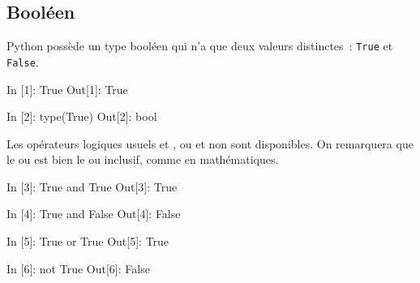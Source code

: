 \documentclass{magnolia}
\begin{document}









\subsection{Booléen}

Python possède un type booléen qui n'a que deux valeurs distinctes~:
\verb_True_ et \verb_False_. 

\begin{pythoncode}
In [1]: True
Out[1]: True

In [2]: type(True)
Out[2]: bool
\end{pythoncode}

\noindent
Les opérateurs logiques usuels \og et \fg, \og ou \fg et \og non \fg sont disponibles. On
remarquera que le \og ou \fg est bien le ou inclusif, comme en mathématiques.

\begin{pythoncode}
In [3]: True and True
Out[3]: True

In [4]: True and False
Out[4]: False

In [5]: True or True
Out[5]: True

In [6]: not True
Out[6]: False
\end{pythoncode}
\end{document}
